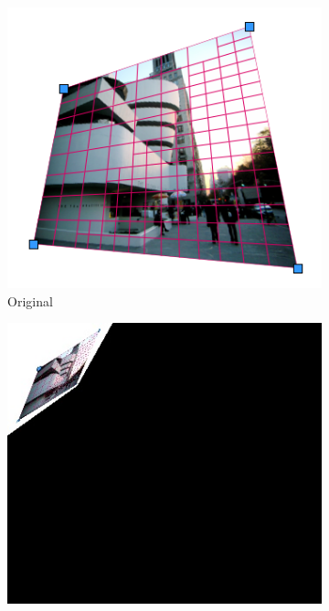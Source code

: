 \documentclass[paper=a4, fontsize=11pt]{scrartcl} %
\begin{document}
\begin{figure}
    \centering
    \begin{subfigure}[ht]{0.3\textwidth}
        \centering
        \includegraphics[width=\textwidth]{figures/img14.jpg}
        \caption{Original\label{fig:img14_tile}}    
    \end{subfigure}
    \hfill
    \begin{subfigure}[ht]{0.3\textwidth}  
        \centering
        \includegraphics[width=\textwidth]{figures/img14_aff.jpg}

\end{subfigure}
\end{figure}
\end{document}
